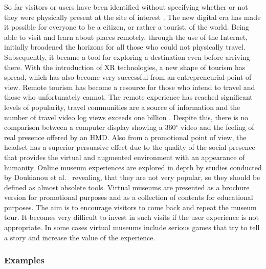 So far visitors or users have been identified without specifying whether or not they were physically present at the site of interest \cite{gaberli_tourism_2019}. The new digital era has made it possible for everyone to be a citizen, or rather a tourist, of the world. Being able to visit and learn about places remotely, through the use of the Internet, initially broadened the horizons for all those who could not physically travel. Subsequently, it became a tool for exploring a destination even before arriving there. With the introduction of XR technologies, a new shape of tourism has spread, which has also become very successful from an entrepreneurial point of view. Remote tourism has become a resource for those who intend to travel and those who unfortunately cannot. The remote experience has reached significant levels of popularity, travel communities are a source of information and the number of travel video log views exceeds one billion \cite{adachi_using_2020}. Despite this, there is no comparison between a computer display showing a 360$^{\circ}$ video and the feeling of real presence offered by an \gls{HMD}. Also from a promotional point of view, the headset has a superior persuasive effect due to the quality of the social presence that provides the virtual and augmented environment with an appearance of humanity.
Online museum experiences are explored in depth by studies conducted by Doukianou et al.~\cite{doukianou_beyond_2020} revealing, that they are not very popular, so they should be defined as almost obsolete tools. Virtual museums are presented as a brochure version for promotional purposes and as a collection of contents for educational purposes. The aim is to encourage visitors to come back and repeat the museum tour. It becomes very difficult to invest in such visits if the user experience is not appropriate. In some cases virtual museums include serious games that try to tell a story and increase the value of the experience. %

\subsubsection{Examples}

